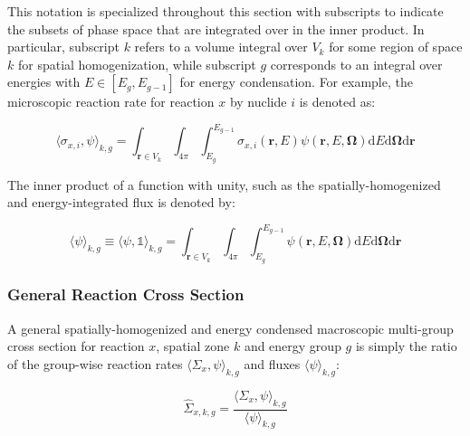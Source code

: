 \noindent This notation is specialized throughout this section with subscripts to indicate the subsets of phase space that are integrated over in the inner product. In particular, subscript $k$ refers to a volume integral over $V_{k}$ for some region of space $k$ for spatial homogenization, while subscript $g$ corresponds to an integral over energies with $E \in [E_{g}, E_{g-1}]$ for energy condensation. For example, the microscopic reaction rate for reaction $x$ by nuclide $i$ is denoted as:

\begin{equation}
\label{eqn:angle-rxn-rate}
\langle \sigma_{x,i}, \psi \rangle_{k,g} = \int_{\mathbf{r} \in V_{k}} \int_{4\pi} \int_{E_{g}}^{E_{g-1}} \sigma_{x,i}(\mathbf{r},E)\psi(\mathbf{r},E,\mathbf{\Omega}) \mathrm{d}E\mathrm{d}\mathbf{\Omega}\mathrm{d}\mathbf{r}
\end{equation}

\noindent The inner product of a function with unity, such as the spatially-homogenized and energy-integrated flux is denoted by:

\begin{equation}
\label{eqn:angle-flux}
\langle \psi \rangle_{k,g} \equiv \langle \psi, \mathbb{1} \rangle_{k,g} = \int_{\mathbf{r} \in V_{k}} \int_{4\pi} \int_{E_{g}}^{E_{g-1}} \psi(\mathbf{r},E,\mathbf{\Omega}) \mathrm{d}E\mathrm{d}\mathbf{\Omega}\mathrm{d}\mathbf{r}
\end{equation}


\subsubsection{General Reaction Cross Section}
\label{subsubsec:tally-types-gen-xs}

A general spatially-homogenized and energy condensed macroscopic multi-group cross section for reaction $x$, spatial zone $k$ and energy group $g$ is simply the ratio of the group-wise reaction rates $\langle \Sigma_{x}, \psi \rangle_{k,g}$ and fluxes $\langle \psi \rangle_{k,g}$:

\begin{equation}
\label{eqn:general-macro}
\hat{\Sigma}_{x,k,g} = \frac{\langle \Sigma_{x}, \psi \rangle_{k,g}}{\langle \psi \rangle_{k,g}}
\end{equation}

